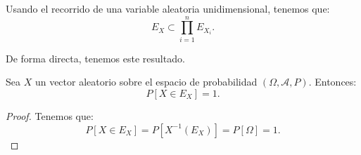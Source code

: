 Usando el recorrido de una variable aleatoria unidimensional, tenemos que:
\begin{equation*}
    E_X \subset \prod_{i=1}^n E_{X_i}.
\end{equation*}

De forma directa, tenemos este resultado.
\begin{prop}
    Sea $X$ un vector aleatorio sobre el espacio de probabilidad $(\Omega, \mathcal{A}, P)$. Entonces:
    \begin{equation*}
        P[X\in E_X] = 1.
    \end{equation*}
\end{prop}
\begin{proof}
    Tenemos que:
    \begin{equation*}
        P[X\in E_X] = P[X^{-1}(E_X)] = P[\Omega] = 1.
    \end{equation*}
\end{proof}

\begin{comment}
Cuando nos preguntamos si es el único, tenemos el siguiente resultado.
\begin{prop}
    Sea $X$ un vector aleatorio, y sea $A\subset \mathbb{R}^n$. Entonces:
    \begin{equation*}
        P[X\in A] = 1 \iff A = E_X.
    \end{equation*}
\end{prop}
\begin{proof} Demostramos mediante doble implicación.
    \begin{itemize}
        \item[$\Longleftarrow$)] Supongamos que $A = E_X$. Veamos ahora que $P[X\in E_X] = 1$. Tenemos que:
        \begin{equation*}
            P[X\in E_X] = P[X^{-1}(E_X)] = P[\Omega] = 1.
        \end{equation*}

        \item[$\Longrightarrow$)] Supongamos que $P[X\in A] = 1$. Demostramos que $A = E_X$ por doble inclusión.
        \begin{description}
            \item[$\subset$)] Tenemos que:
            \begin{equation*}
                P[X\in A] = P[X^{-1}(A)] = 1 \Longrightarrow X^{-1}(A) = \Omega
            \end{equation*}
            Tomando la imagen de $X$, tenemos que $A=X(\Omega) = E_X$.
            
            \item[$\supset$)] Como $P[X\in E_X]\leq 1$ por definición y, al ser una probabilidad, es una función creciente, tenemos que $E_X\subset A$.
        \end{description}
    \end{itemize}
\end{proof}
\end{comment}


